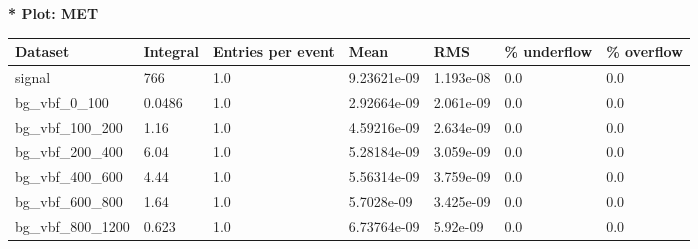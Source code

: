 \documentclass[a4paper, 10pt]{article}
\begin{document}
\textbf{* Plot: MET}\\
   \begin{table}[H]
  \begin{center}
    \begin{tabular}{|m{23.0mm}|m{23.0mm}|m{18.0mm}|m{19.0mm}|m{19.0mm}|m{19.0mm}|m{19.0mm}|}
      \hline
      {\cellcolor{yellow}         Dataset}& {\cellcolor{yellow}         Integral}& {\cellcolor{yellow}         Entries per event}& {\cellcolor{yellow}         Mean}& {\cellcolor{yellow}         RMS}& {\cellcolor{yellow}         \% underflow}& {\cellcolor{yellow}         \% overflow}\\
      \hline
      {\cellcolor{white}         signal}& {\cellcolor{white}         766}& {\cellcolor{white}         1.0}& {\cellcolor{white}         9.23621e-09}& {\cellcolor{white}         1.193e-08}& {\cellcolor{green}         0.0}& {\cellcolor{green}         0.0}\\
      \hline
      {\cellcolor{white}         bg\_vbf\_0\_100}& {\cellcolor{white}         0.0486}& {\cellcolor{white}         1.0}& {\cellcolor{white}         2.92664e-09}& {\cellcolor{white}         2.061e-09}& {\cellcolor{green}         0.0}& {\cellcolor{green}         0.0}\\
      \hline
      {\cellcolor{white}         bg\_vbf\_100\_200}& {\cellcolor{white}         1.16}& {\cellcolor{white}         1.0}& {\cellcolor{white}         4.59216e-09}& {\cellcolor{white}         2.634e-09}& {\cellcolor{green}         0.0}& {\cellcolor{green}         0.0}\\
      \hline
      {\cellcolor{white}         bg\_vbf\_200\_400}& {\cellcolor{white}         6.04}& {\cellcolor{white}         1.0}& {\cellcolor{white}         5.28184e-09}& {\cellcolor{white}         3.059e-09}& {\cellcolor{green}         0.0}& {\cellcolor{green}         0.0}\\
      \hline
      {\cellcolor{white}         bg\_vbf\_400\_600}& {\cellcolor{white}         4.44}& {\cellcolor{white}         1.0}& {\cellcolor{white}         5.56314e-09}& {\cellcolor{white}         3.759e-09}& {\cellcolor{green}         0.0}& {\cellcolor{green}         0.0}\\
      \hline
      {\cellcolor{white}         bg\_vbf\_600\_800}& {\cellcolor{white}         1.64}& {\cellcolor{white}         1.0}& {\cellcolor{white}         5.7028e-09}& {\cellcolor{white}         3.425e-09}& {\cellcolor{green}         0.0}& {\cellcolor{green}         0.0}\\
      \hline
      {\cellcolor{white}         bg\_vbf\_800\_1200}& {\cellcolor{white}         0.623}& {\cellcolor{white}         1.0}& {\cellcolor{white}         6.73764e-09}& {\cellcolor{white}         5.92e-09}& {\cellcolor{green}         0.0}& {\cellcolor{green}         0.0}\\

\end{tabular}
\end{center}
\end{table}
\end{document}

